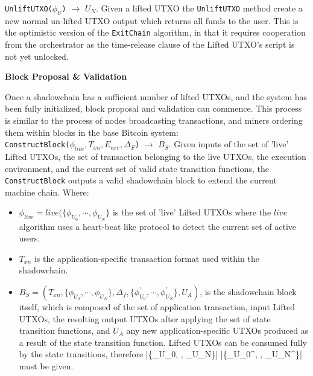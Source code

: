 \documentclass[10pt,a4paper]{article}
\theoremstyle{definition}
\begin{document}
\texttt{UnliftUTXO($\phi_{U}$)} $\rightarrow$ $U_{N}$. Given a lifted UTXO the
\texttt{UnliftUTXO} method create a new normal un-lifted UTXO output
which returns all funds to the user. This is the optimistic version of the
\texttt{ExitChain} algorithm, in that it requires cooperation from the
orchestrator as the time-release clause of the Lifted UTXO's script is not yet
unlocked.


\begin{center}
    \textbf{Block Proposal \& Validation}
\end{center}

Once a shadowchain has a sufficient number of lifted UTXOs, and the system has
been fully initialized, block proposal and validation can commence. This
process is similar to the process of nodes broadcasting transactions, and
miners ordering them within blocks in the base Bitcoin system: \\

\texttt{ConstructBlock($\phi_{live}, T_{xn}, E_{exe}, \Delta_F$)} $\rightarrow$
$B_S$. Given inputs of the set of 'live' Lifted UTXOs, the set of transaction
belonging to the live UTXOs, the execution environment, and the current set of
valid state transition
functions, the \texttt{ConstructBlock} outputs a valid shadowchain block to
extend the current machine chain. Where: 
\begin{itemize}
    \item $\phi_{live} = live(\{\phi_{U_0}, \cdots, \phi_{U_N}\}$ is the set of
            'live' Lifted UTXOs where the $live$ algorithm uses a heart-beat
            like protocol to detect the current set of active users.

    \item $T_{xn}$ is the application-specific transaction format used within
        the shadowchain.

    \item $B_S = (T_{xn}, \{\phi_{U_0}, \cdots, \phi_{U_N}\}, \Delta_{f},
        \{\phi_{U_0}^\prime, \cdots, \phi_{U_N}^\prime\}, U_{A})$, is the
        shadowchain block itself, which is composed of the set of application
        transaction, input Lifted UTXOs, the resulting output UTXOs after
        applying the set of state transition functions, and $U_{A}$ any new
        application-specific UTXOs produced as a result of the state transition
        function. Lifted UTXOs can be consumed fully by the state transitions,
        therefore |\{\phi_{U_0}, \cdots, \phi_{U_N}\}| \geq 
        |\{\phi_{U_0}^\prime, \cdots, \phi_{U_N}^\prime\}| must be given.
\end{itemize}
\end{document}
